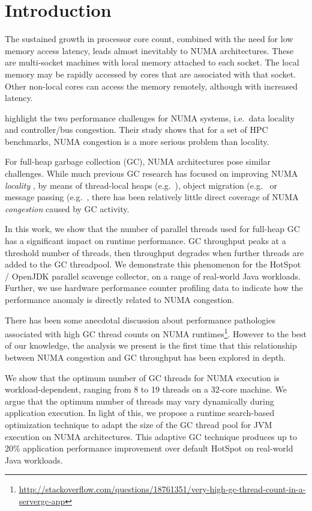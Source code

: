 \section{Introduction}

The sustained growth in processor core count, 
combined with the need for low memory access latency, 
leads almost inevitably to NUMA architectures.  
These are multi-socket machines with local memory attached to each socket.
The local memory may be rapidly accessed by cores that are associated with 
that socket.
Other non-local cores can access the memory remotely, although with increased
latency.

\cite{gaud15challenges} highlight the two performance challenges for NUMA systems, i.e.\ data locality and controller/bus congestion.
Their study shows that for a set of HPC benchmarks, NUMA congestion is a more serious problem than locality.

For full-heap garbage collection (GC), 
NUMA architectures pose similar challenges. 
While much previous GC research has focused on improving NUMA 
\emph{locality} , by means of thread-local heaps
(e.g.\ \cite{marlow11multicore}),
object migration (e.g.\ \cite{tikir05numa} or
message passing (e.g.\ \cite{gidra15numagic},
there has been relatively little direct coverage of NUMA 
\emph{congestion} caused by GC activity.

In this work, we show that the number of 
parallel threads used for full-heap GC has a significant impact on 
runtime performance. GC throughput peaks at a threshold number of threads, 
then throughput degrades when further threads are added to the GC threadpool. 
We demonstrate this phenomenon for the HotSpot / OpenJDK parallel scavenge collector, on a range of real-world Java workloads.
Further, we use hardware performance counter profiling data to 
indicate how the performance anomaly is directly related to NUMA congestion.

There has been some anecdotal discussion about 
performance pathologies associated with high GC 
thread counts on NUMA runtimes\footnote{
\url{http://stackoverflow.com/questions/18761351/very-high-gc-thread-count-in-a-servergc-app}}.
However to the best of our knowledge, the analysis we present is the 
first time that this relationship between NUMA congestion 
and GC throughput has been explored in depth.

We show that the optimum number of GC threads for NUMA execution is
workload-dependent, ranging from 8 to 19 threads on a 32-core machine.
We argue that the optimum number of threads may 
vary dynamically during application execution.
In light of this, we propose a runtime search-based optimization 
technique to adapt the size of the GC thread pool for 
JVM execution on NUMA architectures.
This adaptive GC technique produces up to 20\% application performance improvement over default HotSpot on real-world Java workloads.